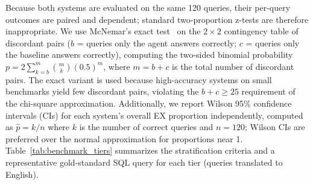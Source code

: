 \documentclass[conference]{IEEEtran}
\begin{document}
Because both systems are evaluated on the same 120 queries, their per-query outcomes are paired and dependent; standard two-proportion z-tests are therefore inappropriate.
We use McNemar's exact test~\cite{dietterich1998} on the $2{\times}2$ contingency table of discordant pairs ($b$ = queries only the agent answers correctly;
$c$ = queries only the baseline answers correctly), computing the two-sided binomial probability  $p = 2\sum_{k=b}^{m}{\binom{m}{k}(0.5)^m}$, where $m{=}b{+}c$ is the total number of discordant pairs. The exact variant is used because high-accuracy systems on small benchmarks yield few discordant pairs, violating the $b{+}c \geq 25$ requirement of the chi-square approximation. Additionally, we report Wilson 95\% {confidence intervals (CIs)} for each system's overall EX proportion independently, computed as $\hat{p} = k/n$ where $k$ is the number of correct queries and $n{=}120$; Wilson CIs are preferred over the normal approximation for proportions near 1.
Table~\ref{tab:benchmark_tiers} summarizes the stratification criteria and a representative gold-standard SQL query for each tier (queries translated to English).
\end{document}
